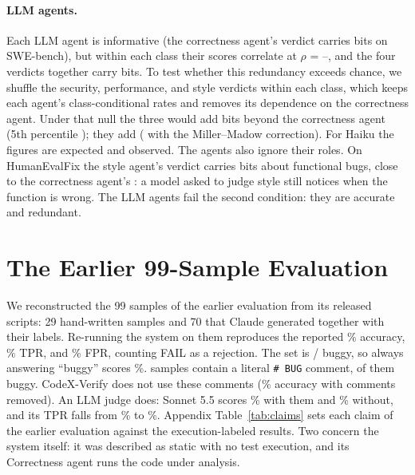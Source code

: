 \paragraph{LLM agents.}
Each LLM agent is informative (the correctness agent's verdict carries \nSonnetSweMiC{} bits on SWE-bench), but within each class their scores correlate at $\rho$ = \nSonnetSweRhoMin--\nSonnetSweRhoMax, and the four verdicts together carry \nSonnetSweMiAll{} bits. To test whether this redundancy exceeds chance, we shuffle the security, performance, and style verdicts within each class, which keeps each agent's class-conditional rates and removes its dependence on the correctness agent. Under that null the three would add \nSonnetPermNull{} bits beyond the correctness agent (5th percentile \nSonnetPermNullLo); they add \nSonnetPermObs{} (\nSonnetPermObsMm{} with the Miller--Madow correction). For Haiku the figures are \nHaikuPermNull{} expected and \nHaikuPermObs{} observed. The agents also ignore their roles. On HumanEvalFix the style agent's verdict carries \nSonnetHefMiSt{} bits about functional bugs, close to the correctness agent's \nSonnetHefMiC: a model asked to judge style still notices when the function is wrong. The LLM agents fail the second condition: they are accurate and redundant.

\section{The Earlier 99-Sample Evaluation}
\label{sec:v1}

We reconstructed the 99 samples of the earlier evaluation from its released scripts: 29 hand-written samples and 70 that Claude generated together with their labels. Re-running the system on them reproduces the reported \nOldCvAcc\% accuracy, \nOldCvTpr\% TPR, and \nOldCvFpr\% FPR, counting FAIL as a rejection. The set is \nOldBuggy/\nOldN{} buggy, so always answering ``buggy'' scores \nOldMajority\%. \nOldBugComments{} samples contain a literal \texttt{\# BUG} comment, \nOldBugCommentsBuggy{} of them buggy. CodeX-Verify does not use these comments (\nOldCvStripAcc\% accuracy with comments removed). An LLM judge does: Sonnet 5.5 scores \nOldSonnetAcc\% with them and \nOldSonnetStripAcc\% without, and its TPR falls from \nOldSonnetTpr\% to \nOldSonnetStripTpr\%. Appendix Table~\ref{tab:claims} sets each claim of the earlier evaluation against the execution-labeled results. Two concern the system itself: it was described as static with no test execution, and its Correctness agent runs the code under analysis.

